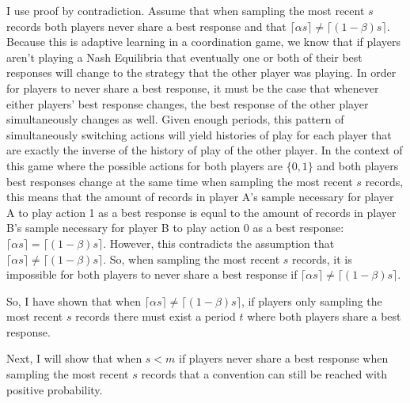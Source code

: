 \documentclass[12pt]{article}
\begin{document}
I use proof by contradiction. Assume that when sampling the most recent $s$ records both players never share a best response and that $\lceil \alpha s \rceil \neq \lceil (1-\beta) s \rceil$. Because this is adaptive learning in a coordination game, we know that if players aren't playing a Nash Equilibria that eventually one or both of their best responses will change to the strategy that the other player was playing. In order for players to never share a best response, it must be the case that whenever either players' best response changes, the best response of the other player simultaneously changes as well. Given enough periods, this pattern of simultaneously switching actions will yield histories of play for each player that are exactly the inverse of the history of play of the other player. In the context of this game where the possible actions for both players are $\{0,1\}$ and both players best responses change at the same time when sampling the most recent $s$ records, this means that the amount of records in player A's sample necessary for player A to play action 1 as a best response is equal to the amount of records in player B's sample necessary for player B to play action 0 as a best response: $\lceil \alpha s \rceil = \lceil (1-\beta) s \rceil$. However, this contradicts the assumption that $\lceil \alpha s \rceil \neq \lceil (1-\beta) s \rceil$. So, when sampling the most recent $s$ records, it is impossible for both players to never share a best response if $\lceil \alpha s \rceil \neq \lceil (1-\beta) s \rceil$.

\vskip6pt

So, I have shown that when $\lceil \alpha s \rceil \neq \lceil (1-\beta) s \rceil$, if players only sampling the most recent $s$ records there must exist a period $t$ where both players share a best response. 

\vskip12pt

Next, I will show that when $s < m$ if players never share a best response when sampling the most recent $s$ records that a convention can still be reached with positive probability.

\vskip12pt
\end{document}
